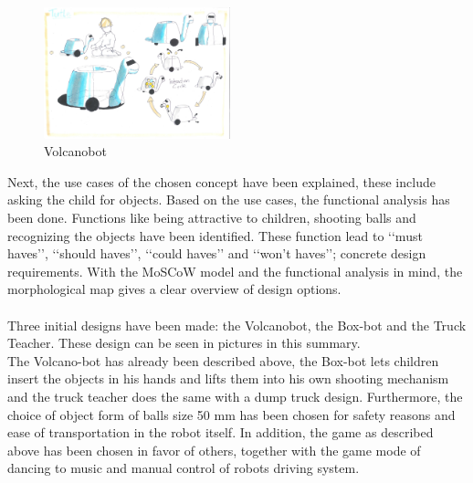 \documentclass[11pt,twoside,a4paper]{report}
\begin{document}
 \begin{figure}
    \includegraphics[width=0.48\textwidth]{Images/VolcanoBotConcept.pdf}
  \caption{Volcanobot}
  \label{figure:volcanobot}
\end{figure}
Next, the use cases of the chosen concept have been explained, these include asking the child for objects. Based on the use cases, the functional analysis has been done. Functions like being attractive to children, shooting balls and recognizing the objects have been identified.  These function lead to \lq\lq{}must haves\rq\rq{}, \lq\lq{}should haves\rq\rq{}, \lq\lq{}could haves\rq\rq{} and \lq\lq{}won\rq{}t haves\rq\rq{}; concrete design requirements. With the MoSCoW model and the functional analysis in mind, the morphological map gives a clear overview of design options.\\
 \\


Three initial designs have been made: the Volcanobot, the Box-bot and the Truck Teacher. These design can be seen in pictures in this summary.\\
 The Volcano-bot has already been described above, the Box-bot lets children insert the objects in his hands and lifts them into his own shooting mechanism and the truck teacher does the same with a dump truck design. Furthermore, the choice of object form of balls size 50 mm has been chosen for safety reasons and ease of transportation in the robot itself. In addition, the game as described above has been chosen in favor of others, together with the game mode of dancing to music and manual control of robots driving system.
 
\end{document}
